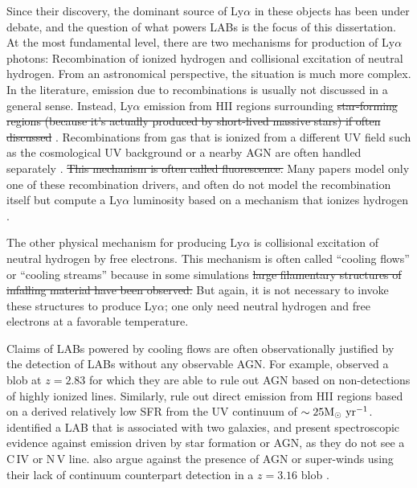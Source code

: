 Since their discovery, the dominant source of Ly$\alpha$ in these objects has been under debate, and the question of what powers LABs is the focus of this dissertation.
At the most fundamental level, there are two mechanisms for production of Ly$\alpha$ photons: Recombination of ionized hydrogen and collisional excitation of neutral hydrogen.
From an astronomical perspective, the situation is much more complex.
In the literature, emission due to recombinations is usually not discussed in a general sense.
Instead, Ly$\alpha$ emission from HII regions surrounding \sout{star-forming regions (because it's actually produced by short-lived massive stars) if often discussed} \citep[e.g.][]{Geach2016}.
Recombinations from gas that is ionized from a different UV field such as the cosmological UV background or a nearby AGN are often handled separately \citep{Kollmeier2010,Gronke2017}.
\sout{This mechanism is often called fluorescence.}
Many papers model only one of these recombination drivers, and often do not model the recombination itself but compute a Ly$\alpha$ luminosity based on a mechanism that ionizes hydrogen  \citep[e.g.][]{Cen2013}.

The other physical mechanism for producing Ly$\alpha$ is collisional excitation of neutral hydrogen by free electrons.
This mechanism is often called ``cooling flows'' or ``cooling streams'' because in some simulations  \sout{large filamentary structures of infalling material have been observed.}
But again, it is not necessary to invoke these structures to produce Ly$\alpha$; one only need neutral hydrogen and free electrons at a favorable temperature. 

Claims of LABs powered by cooling flows are often observationally justified by the detection of LABs without any observable AGN.
For example, \citet{Smith2007} observed a blob at $z=2.83$ for which they are able to rule out AGN based on non-detections of highly ionized lines.
Similarly, \citet{Smith2007} rule out direct emission from HII regions based on a derived relatively low SFR from the UV continuum of  $\sim 25 \rm{M}_{\odot}\ \rm{yr}^{-1}$.
 \citet{Scarlata2009} identified a LAB that is associated with two galaxies, and present spectroscopic evidence against emission driven by star formation or AGN, as they do not see a C\,\textsc{IV} or N\,\textsc{V} line.
\citet{Nilsson2006} also argue against the presence of AGN or super-winds using their lack of continuum counterpart detection in a $z=3.16$ blob \citep[though this is debated, see e.g.][]{Prescott2015}.

